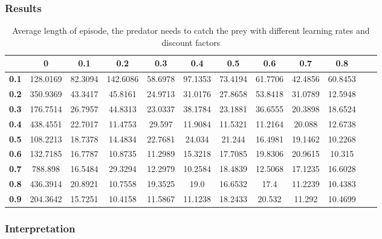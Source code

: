 \documentclass[11pt]{article}
\begin{document}
\subsubsection{Results}

\begin{center}
\begin{table*}[ht]
{\small
\hfill{}
\begin{tabular}{c|c|c|c|c|c|c|c|c|c|c|c}
\textbf{} & \textbf{0} & \textbf{0.1} & \textbf{0.2} & \textbf{0.3} & \textbf{0.4} & \textbf{0.5} & \textbf{0.6} & \textbf{0.7} & \textbf{0.8}\\
	\hline
\textbf{0.1} & 128.0169 & 82.3094 & 142.6086 & 58.6978 & 97.1353 & 73.4194 & 61.7706 & 42.4856 & 60.8453 & \\
\textbf{0.2} & 350.9369 & 43.3417 & 45.8161 & 24.9713 & 31.0176 & 27.8658 & 53.8418 & 31.0789 & 12.5948 & \\
\textbf{0.3} & 176.7514 & 26.7957 & 44.8313 & 23.0337 & 38.1784 & 23.1881 & 36.6555 & 20.3898 & 18.6524 & \\
\textbf{0.4} & 438.4551 & 22.7017 & 11.4753 & 29.597 & 11.9084 & 11.5321 & 11.2164 & 20.088 & 12.6738 & \\
\textbf{0.5} & 108.2213 & 18.7378 & 14.4834 & 22.7681 & 24.034 & 21.244 & 16.4981 & 19.1462 & 10.2268 & \\
\textbf{0.6} & 132.7185 & 16.7787 & 10.8735 & 11.2989 & 15.3218 & 17.7085 & 19.8306 & 20.9615 & 10.315 & \\
\textbf{0.7} & 788.898 & 16.5484 & 29.3294 & 12.2979 & 10.2584 & 18.4839 & 12.5068 & 17.1235 & 16.6028 & \\
\textbf{0.8} & 436.3914 & 20.8921 & 10.7558 & 19.3525 & 19.0 & 16.6532 & 17.4 & 11.2239 & 10.4383 & \\
\textbf{0.9} & 204.3642 & 15.7251 & 10.4158 & 11.5867 & 11.1238 & 18.2433 & 20.532 & 11.292 & 10.4699 & \\
\end{tabular}}
\hfill{}
\caption{Average length of episode, the predator needs to catch the prey with different learning rates and discount factors}
\label{table:task1}
\end{table*}
\end{center}


\subsubsection{Interpretation}
\end{document}
